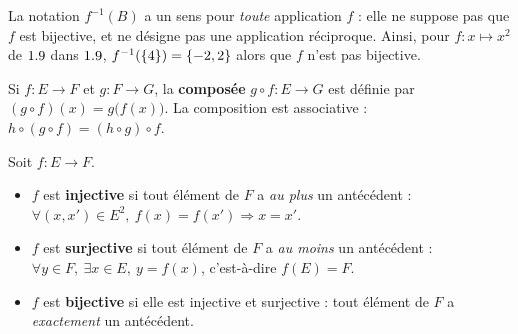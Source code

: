 \begin{attention}
La notation $f^{-1}(B)$ a un sens pour \emph{toute} application $f$ : elle ne
suppose pas que $f$ est bijective, et ne désigne pas une application
réciproque. Ainsi, pour $f:x\mapsto x^{2}$ de $1.9$ dans $1.9$,
$f^{-1}(\left\{4\right\})=\left\{-2,2\right\}$ alors que $f$ n'est pas bijective.
\end{attention}

\begin{definition}[Composition]
Si $f:E\to F$ et $g:F\to G$, la \textbf{composée} $g\circ f:E\to G$ est
définie par $(g\circ f)(x)=g\bigl(f(x)\bigr)$. La composition est associative :
$h\circ(g\circ f)=(h\circ g)\circ f$.
\end{definition}

\begin{definition}
Soit $f:E\to F$.
\begin{itemize}[label={\color{otNavy}\textbullet},leftmargin=1.4em,itemsep=0.6mm,topsep=0.8mm]
  \item $f$ est \textbf{injective} si tout élément de $F$ a \emph{au plus} un antécédent :
    $\forall (x,x')\in E^{2},\ f(x)=f(x')\Rightarrow x=x'$.
  \item $f$ est \textbf{surjective} si tout élément de $F$ a \emph{au moins} un antécédent :
    $\forall y\in F,\ \exists x\in E,\ y=f(x)$, c'est-à-dire $f(E)=F$.
  \item $f$ est \textbf{bijective} si elle est injective et surjective : tout
    élément de $F$ a \emph{exactement} un antécédent.
\end{itemize}
\end{definition}

